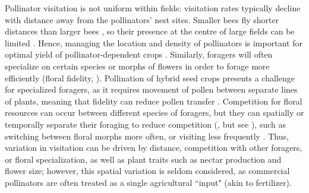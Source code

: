 \documentclass[12pt]{article} %
\begin{document}
Pollinator visitation is not uniform within fields: visitation rates typically decline with distance away from the pollinators' nest sites.
Smaller bees fly shorter distances than larger bees \citep{greenleaf2007,zurbuchen2010}, so their presence at the centre of large fields can be limited \citep{isaacs2010}. 
Hence, managing the location and density of pollinators is important for optimal yield of pollinator-dependent crops \citep{fries1983,cresswell2004b}.
Similarly, foragers will often specialize on certain species or morphs of flowers in order to forage more efficiently (floral fidelity, \citealp{heinrich1976b, goulson1997}). 
Pollination of hybrid seed crops presents a challenge for specialized foragers, as it requires movement of pollen between separate lines of plants, meaning that fidelity can reduce pollen transfer \citep{waytesMsc, gaffney2019}.
Competition for floral resources can occur between different species of foragers, but they can spatially or temporally separate their foraging to reduce competition (\citealp{schaffer1979,thomson1987}, but see \citealp{steffan2000}), such as switching between floral morphs more often, or visiting less frequently \citep{heinrich1979, greenleaf2006}.
Thus, variation in visitation can be driven by distance, competition with other foragers, or floral specialization, as well as plant traits such as nectar production and flower size; however, this spatial variation is seldom considered, as commercial pollinators are often treated as a single agricultural ``input" (akin to fertilizer).
\end{document}
